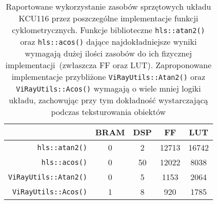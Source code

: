 
\begin{table}[H]
\centering
\caption[Wykorzystanie zasobów sprzętowych układu KCU116 przez poszczególne implementacje funkcji cyklometrycznych]{Raportowane wykorzystanie zasobów sprzętowych układu KCU116 przez poszczególne implementacje funkcji cyklometrycznych. Funkcje biblioteczne \texttt{hls::atan2()} oraz \texttt{hls::acos()} dające najdokładniejsze wyniki wymagają dużej ilości zasobów do ich fizycznej implementacji~(zwłaszcza FF oraz LUT). Zaproponowane implementacje przybliżone \texttt{ViRayUtils::Atan2()} oraz \texttt{ViRayUtils::Acos()} wymagają o wiele mniej logiki układu, zachowując przy tym dokładność wystarczającą podczas teksturowania obiektów}
\label{ch3:tab:atan_acos}
\begin{tabular}{|r|c|c|c|c|}
\hline
\multicolumn{1}{|l|}{}       & \textbf{BRAM} & \textbf{DSP} & \textbf{FF} & \textbf{LUT} \\ \hline\hline

\texttt{hls::atan2()}         & 0             & 2            & 12713       & 16742        \\ \hline
\texttt{hls::acos()}         & 0             & 50           & 12022       & 8038         \\ \hline\hline
\texttt{ViRayUtils::Atan2()} & 0             & 5            & 1153        & 2064         \\ \hline
\texttt{ViRayUtils::Acos()}  & 1             & 8            & 920         & 1785         \\ \hline

\end{tabular}
\end{table}